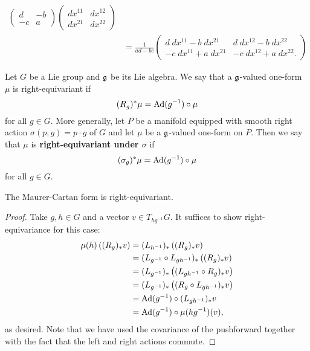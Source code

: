 \begin{exmp}
\begin{align*}
\begin{pmatrix}
            d&-b\\-c&a
        \end{pmatrix}\begin{pmatrix}
            dx^{11}&dx^{12}\\dx^{21}&dx^{22}
        \end{pmatrix}\\
        &=\frac{1}{ad-bc}\begin{pmatrix}
            d\;dx^{11}-b\;dx^{21}&d\;dx^{12}-b\;dx^{22}\\-c\;dx^{11}+a\;dx^{21}&-c\;dx^{12}+a\;dx^{22}.
        \end{pmatrix}
    \end{align*}
\end{exmp}

\begin{defn}
    Let $G$ be a Lie group and $\mathfrak g$ be its Lie algebra. We say that a $\mathfrak g$-valued one-form $\mu$ is right-equivariant if
    \[(R_g)^*\mu=\operatorname{Ad}(g^{-1})\circ \mu\]
    for all $g\in G$. More generally, let $P$ be a manifold equipped with smooth right action $\sigma(p,g)=p\cdot g$ of $G$ and let $\mu$ be a $\mathfrak g$-valued one-form
    on $P$. Then we say that $\mu$ is \textbf{right-equivariant under $\sigma$} if
    \[(\sigma_g)^*\mu=\operatorname{Ad}(g^{-1})\circ \mu\]
    for all $g\in G$.
\end{defn}

\begin{lem}
    The Maurer-Cartan form is right-equivariant.
\end{lem}
\begin{proof}
    Take $g,h\in G$ and a vector $v\in T_{hg^{-1}}G$. It suffices to show right-equivariance for this case:
    \begin{align*}
        \mu(h)\left( (R_g)_*v \right)&=(L_{h^{-1}})_*\left( (R_g)_*v \right)\\
        &=(L_{g^{-1}}\circ L_{gh^{-1}})_*\left( (R_g)_*v \right)\\
        &=(L_{g^{-1}})_*\left( (L_{gh^{-1}}\circ R_g)_*v \right)\\
        &=(L_{g^{-1}})_*\left( (R_g\circ L_{gh^{-1}})_*v\right)\\
        &=\operatorname{Ad}(g^{-1})\circ (L_{gh^{-1}})_*v\\
        &=\operatorname{Ad}(g^{-1})\circ \mu(hg^{-1})(v),
    \end{align*}
    as desired. Note that we have used the covariance of the pushforward together with the fact that the left and right actions
    commute.
\end{proof}

